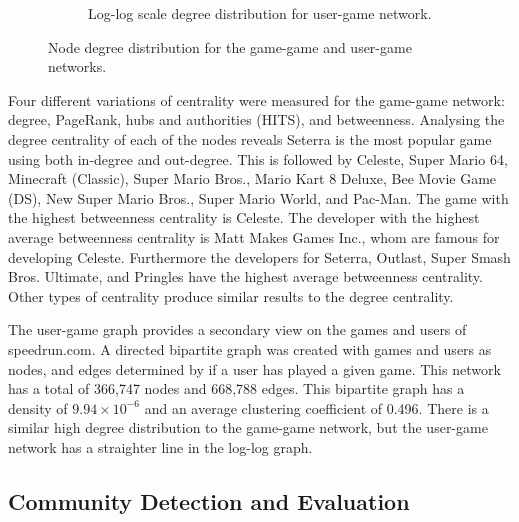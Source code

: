 \begin{figure}[h]
\begin{subfigure}{0.45\linewidth}
    \caption{Log-log scale degree distribution for user-game network.}
    \label{fig:figure2}
  \end{subfigure}
  \caption{Node degree distribution for the game-game and user-game networks.}
  \label{fig:figures}
\end{figure}

Four different variations of centrality were measured for the game-game network: degree, PageRank, hubs and authorities (HITS), and betweenness. Analysing the degree centrality of each of the nodes reveals Seterra is the most popular game using both in-degree and out-degree. This is followed by Celeste, Super Mario 64, Minecraft (Classic), Super Mario Bros., Mario Kart 8 Deluxe, Bee Movie Game (DS), New Super Mario Bros., Super Mario World, and Pac-Man. The game with the highest betweenness centrality is Celeste. The developer with the highest average betweenness centrality is Matt Makes Games Inc., whom are famous for developing Celeste. Furthermore the developers for Seterra, Outlast, Super Smash Bros. Ultimate, and Pringles have the highest average betweenness centrality. Other types of centrality produce similar results to the degree centrality. 


The user-game graph provides a secondary view on the games and users of speedrun.com. A directed bipartite graph was created with games and users as nodes, and edges determined by if a user has played a given game. This network has a total of 366,747 nodes and 668,788 edges. This bipartite graph has a density of $9.94 \times 10^{-6}$ and an average clustering coefficient of 0.496. There is a similar high degree distribution to the game-game network, but the user-game network has a straighter line in the log-log graph.

\subsection{Community Detection and Evaluation}

